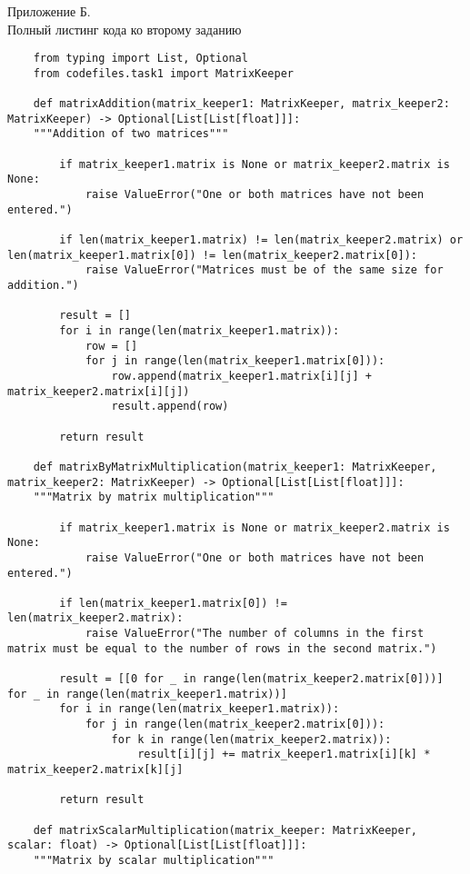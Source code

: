 \centering\begin{large}
	{Приложение Б.\\
		Полный листинг кода ко второму заданию}\\
\end{large}
\begin{lstlisting}
	from typing import List, Optional
	from codefiles.task1 import MatrixKeeper
	
	def matrixAddition(matrix_keeper1: MatrixKeeper, matrix_keeper2: MatrixKeeper) -> Optional[List[List[float]]]:
	"""Addition of two matrices"""
	
		if matrix_keeper1.matrix is None or matrix_keeper2.matrix is None:
			raise ValueError("One or both matrices have not been entered.")
		
		if len(matrix_keeper1.matrix) != len(matrix_keeper2.matrix) or len(matrix_keeper1.matrix[0]) != len(matrix_keeper2.matrix[0]):
			raise ValueError("Matrices must be of the same size for addition.")
		
		result = []
		for i in range(len(matrix_keeper1.matrix)):
			row = []
			for j in range(len(matrix_keeper1.matrix[0])):
				row.append(matrix_keeper1.matrix[i][j] + matrix_keeper2.matrix[i][j])
				result.append(row)
		
		return result
	
	def matrixByMatrixMultiplication(matrix_keeper1: MatrixKeeper, matrix_keeper2: MatrixKeeper) -> Optional[List[List[float]]]:
	"""Matrix by matrix multiplication"""
	
		if matrix_keeper1.matrix is None or matrix_keeper2.matrix is None:
			raise ValueError("One or both matrices have not been entered.")
		
		if len(matrix_keeper1.matrix[0]) != len(matrix_keeper2.matrix):
			raise ValueError("The number of columns in the first matrix must be equal to the number of rows in the second matrix.")
		
		result = [[0 for _ in range(len(matrix_keeper2.matrix[0]))] for _ in range(len(matrix_keeper1.matrix))]
		for i in range(len(matrix_keeper1.matrix)):
			for j in range(len(matrix_keeper2.matrix[0])):
				for k in range(len(matrix_keeper2.matrix)):
					result[i][j] += matrix_keeper1.matrix[i][k] * matrix_keeper2.matrix[k][j]
		
		return result
	
	def matrixScalarMultiplication(matrix_keeper: MatrixKeeper, scalar: float) -> Optional[List[List[float]]]:
	"""Matrix by scalar multiplication"""
	

\end{lstlisting}
